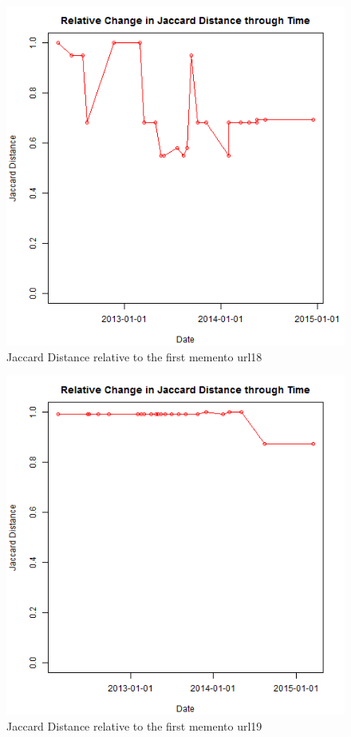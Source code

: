 \begin{figure}[ht]
	\begin{center}
		 \includegraphics[scale=0.60]{url18}
		  \caption{Jaccard Distance relative to the first memento url18}
	 \end{center}
\end{figure}
\begin{figure}[ht]
	\begin{center}
		 \includegraphics[scale=0.60]{url19}
		  \caption{Jaccard Distance relative to the first memento url19}
	 \end{center}
\end{figure}
